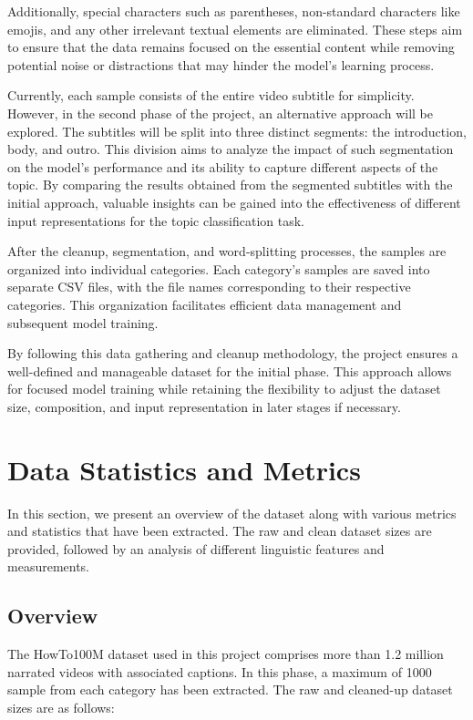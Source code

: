 \documentclass{article}
\begin{document}
Additionally, special characters such as parentheses, non-standard characters like emojis, and any other irrelevant textual elements are eliminated.
These steps aim to ensure that the data remains focused on the essential content while removing potential noise or distractions that may hinder the model's learning process.

Currently, each sample consists of the entire video subtitle for simplicity.
However, in the second phase of the project, an alternative approach will be explored.
The subtitles will be split into three distinct segments: the introduction, body, and outro.
This division aims to analyze the impact of such segmentation on the model's performance and its ability to capture different aspects of the topic.
By comparing the results obtained from the segmented subtitles with the initial approach, valuable insights can be gained into the effectiveness of different input representations for the topic classification task.

After the cleanup, segmentation, and word-splitting processes, the samples are organized into individual categories.
Each category's samples are saved into separate CSV files, with the file names corresponding to their respective categories.
This organization facilitates efficient data management and subsequent model training.

By following this data gathering and cleanup methodology, the project ensures a well-defined and manageable dataset for the initial phase.
This approach allows for focused model training while retaining the flexibility to adjust the dataset size, composition, and input representation in later stages if necessary.
\section{Data Statistics and Metrics}
In this section, we present an overview of the dataset along with various metrics and statistics that have been extracted.
The raw and clean dataset sizes are provided, followed by an analysis of different linguistic features and measurements.

\subsection{Overview}
The HowTo100M dataset used in this project comprises more than 1.2 million narrated videos with associated captions.
In this phase, a maximum of 1000 sample from each category has been extracted.
The raw and cleaned-up dataset sizes are as follows:
\end{document}

